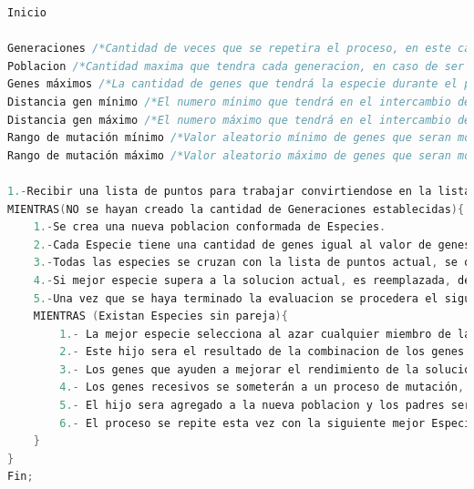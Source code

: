 \begin{lstlisting}[language=C++, caption=Algoritmo Genetico aplicado en las pruebas, label=lst:AlgoritmoGeneticoPruebas]
Inicio

Generaciones /*Cantidad de veces que se repetira el proceso, en este caso la cantidad de nuevas generaciones de hijos*/
Poblacion /*Cantidad maxima que tendra cada generacion, en caso de ser impar se eliminara el unico que quede sin pareja durante el proceso de cruza*/
Genes máximos /*La cantidad de genes que tendrá la especie durante el proceso de búsqueda local*/
Distancia gen mínimo /*El numero mínimo que tendrá en el intercambio de posiciones*/
Distancia gen máximo /*El numero máximo que tendrá en el intercambio de posiciones*/
Rango de mutación mínimo /*Valor aleatorio mínimo de genes que seran modificados durante la mutacion, esta cantidad es un porcentaje se calcula con el valor de genes maximos*/
Rango de mutación máximo /*Valor aleatorio máximo de genes que seran modificados durante la mutacion, esta cantidad es un porcentaje se calcula con el valor de genes maximos*/

1.-Recibir una lista de puntos para trabajar convirtiendose en la lista de puntos actual.
MIENTRAS(NO se hayan creado la cantidad de Generaciones establecidas){
	1.-Se crea una nueva poblacion conformada de Especies.
	2.-Cada Especie tiene una cantidad de genes igual al valor de genes maximos y sus valores oscilan entre los numeros maximos y minimos de distancia.
	3.-Todas las especies se cruzan con la lista de puntos actual, se ordenan de acuerdo a su desempeño.
	4.-Si mejor especie supera a la solucion actual, es reemplazada, de lo contrario la solucion actual permanecera dentro de la poblacion sustituyendo a la solucion mas debil.
	5.-Una vez que se haya terminado la evaluacion se procedera el siguiente paso.
	MIENTRAS (Existan Especies sin pareja){
		1.- La mejor especie selecciona al azar cualquier miembro de la poblacion convirtiendose en padre y madre de la siguiente especie.
		2.- Este hijo sera el resultado de la combinacion de los genes en posiciones pares del padre y los genes de las posiciones impares de la madre.
		3.- Los genes que ayuden a mejorar el rendimiento de la solución se llamaran dominantes mientras que los que afecten se llamaran recesivos.
		4.- Los genes recesivos se someterán a un proceso de mutación, donde sus valores seran alterados de acuerdo a las distancias minimas y maximas, la cantidad de genes mutados sera determinado por los rangos minimos y maximos de mutacion.
		5.- El hijo sera agregado a la nueva poblacion y los padres seran descartados.
		6.- El proceso se repite esta vez con la siguiente mejor Especie.
	}
}
Fin;
\end{lstlisting}

